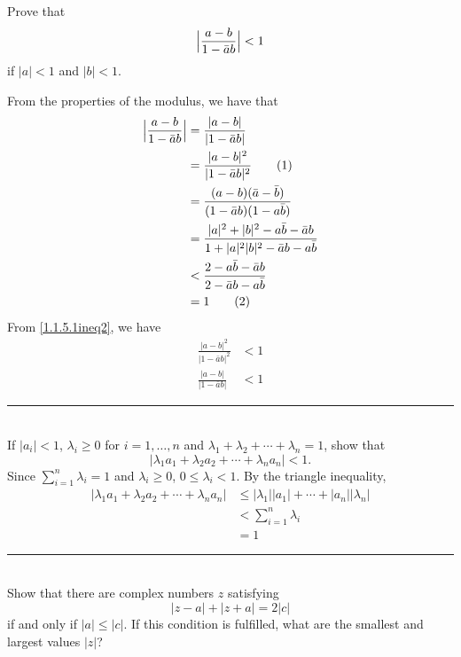 \documentclass[notitlepage]{report}
\newcommand{\eqnumtag}{%
	\refstepcounter{equation}%
	\tag{\theequation}%
}
\begin{document}
	   Prove that
	   \[
	   \Bigl\lvert\frac{a - b}{1 - \bar{a}b}\Bigr\rvert < 1
	   \]
	   if \(\lvert a\rvert < 1\) and \(\lvert b\rvert < 1\).
	   \par\smallskip
	   From the properties of the modulus, we have that
	   \begin{align*}
	   \Bigl\lvert\frac{a - b}{1 - \bar{a}b}\Bigr\rvert
	   & = \frac{\lvert a - b\rvert}{\lvert 1 - \bar{a}b\rvert}\\
	   & = \frac{\lvert a - b\rvert^2}{\lvert 1 - \bar{a}b\rvert^2}\eqnumtag
	   \label{1.1.5.1ineq1}\\
	   & = \frac{(a - b)(\bar{a} - \bar{b})}{(1 - \bar{a}b)(1 - a\bar{b})}\\
	   & = \frac{\lvert a\rvert^2 + \lvert b\rvert^2 - a\bar{b} - \bar{a}b}
	   {1 + \lvert a\rvert^2\lvert b\rvert^2 - \bar{a}b - a\bar{b}}\\
	   & < \frac{2 - a\bar{b} - \bar{a}b}{2 - \bar{a}b - a\bar{b}}\\
	   & = 1\eqnumtag\label{1.1.5.1ineq2}
	   \end{align*}
	   From \eqref{1.1.5.1ineq2}, we have
	   \begin{align*}
	   \frac{\lvert a - b\rvert^2}{\lvert 1 - \bar{a}b\rvert^2} & < 1\\
	   \frac{\lvert a - b\rvert}{\lvert 1 - \bar{a}b\rvert} & < 1
	   \end{align*}
	   
	   
	   \noindent\rule{\textwidth}{1pt}\\[-0.1cm]
	   
	   
	 If \(\lvert a_i\rvert < 1\), \(\lambda_i\geq 0\) for \(i = 1,\ldots,n\) and
	 \(\lambda_1 + \lambda_2 + \cdots + \lambda_n = 1\), show that
	 \[
	 \lvert\lambda_1a_1 + \lambda_2a_2 + \cdots + \lambda_na_n\rvert < 1.
	 \]
	 Since \(\sum_{i = 1}^n\lambda_i = 1\) and \(\lambda_i\geq 0\),
	 \(0\leq \lambda_i < 1\).
	 By the triangle inequality,
	 \begin{align*}
	 \lvert\lambda_1a_1 + \lambda_2a_2 + \cdots + \lambda_na_n\rvert
	 & \leq\lvert\lambda_1\rvert\lvert a_1\rvert + \cdots +
	 \lvert a_n\rvert\lvert\lambda_n\rvert\\
	 & < \sum_{i = 1}^n\lambda_i\\
	 & = 1
	 \end{align*}
	 
	 
	 \noindent\rule{\textwidth}{1pt}\\[-0.1cm]
	 
	  Show that there are complex numbers \(z\) satisfying
	  \[
	  \lvert z - a\rvert + \lvert z + a\rvert = 2\lvert c\rvert
	  \]
	  if and only if \(\lvert a\rvert\leq\lvert c\rvert\).
	  If this condition is fulfilled, what are the smallest and largest values
	  \(\lvert z\rvert\)?
	  \par\smallskip
	  
\end{document}
